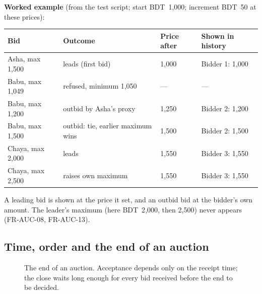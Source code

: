 \documentclass[11pt,a4paper]{article}
\begin{document}
\textbf{Worked example} (from the test script; start BDT~1{,}000; increment BDT~50 at these prices):
\begin{center}
\small
\begin{tabular}{@{}l l l l@{}}
\toprule
\textbf{Bid} & \textbf{Outcome} & \textbf{Price after} & \textbf{Shown in history} \\ \midrule
Asha, max 1{,}500 & leads (first bid) & 1{,}000 & Bidder 1: 1{,}000 \\
Babu, max 1{,}049 & refused, minimum 1{,}050 & --- & --- \\
Babu, max 1{,}200 & outbid by Asha's proxy & 1{,}250 & Bidder 2: 1{,}200 \\
Babu, max 1{,}500 & outbid: tie, earlier maximum wins & 1{,}500 & Bidder 2: 1{,}500 \\
Chaya, max 2{,}000 & leads & 1{,}550 & Bidder 3: 1{,}550 \\
Chaya, max 2{,}500 & raises own maximum & 1{,}550 & Bidder 3: 1{,}550 \\
\bottomrule
\end{tabular}
\end{center}
A leading bid is shown at the price it set, and an outbid bid at the bidder's own amount. The leader's maximum (here BDT~2{,}000, then 2{,}500) never appears (FR-AUC-08, FR-AUC-13).

\subsection{Time, order and the end of an auction}
\label{sec:timing}
\begin{figure}[!htbp]
\centering
{}
\caption{The end of an auction. Acceptance depends only on the receipt time; the close waits long enough for every bid received before the end to be decided.}
\label{fig:timing}
\end{figure}
\end{document}
